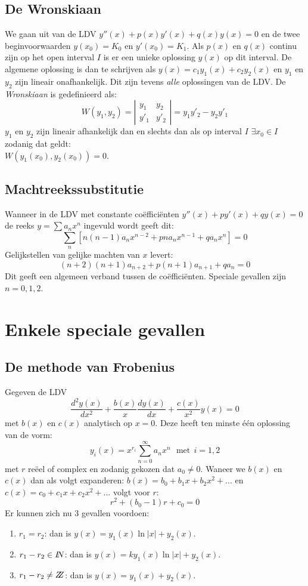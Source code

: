 \subsection{De Wronskiaan}
We gaan uit van de LDV $y''(x)+p(x)y'(x)+q(x)y(x)=0$ en de twee beginvoorwaarden
$y(x_0)=K_0$ en $y'(x_0)=K_1$. Als $p(x)$ en $q(x)$ continu zijn op het open
interval $I$ is er een unieke oplossing $y(x)$ op dit interval.
\npar
De algemene oplossing is dan te schrijven als $y(x)=c_1y_1(x)+c_2y_2(x)$ en
$y_1$ en $y_2$ zijn lineair onafhankelijk. Dit zijn tevens {\it alle}
oplossingen van de LDV.
\npar
De {\it Wronskiaan} is gedefinieerd als:
\[
W(y_1,y_2)=
\left|\begin{array}{cc}
y_1&y_2\\
y'_1&y'_2
\end{array}\right|=y_1y'_2-y_2y'_1
\]
$y_1$ en $y_2$ zijn lineair afhankelijk dan en slechts dan als op interval
$I$ $\exists x_0\in I$ zodanig dat geldt:\\
$W(y_1(x_0),y_2(x_0))=0$.

\subsection{Machtreekssubstitutie}
Wanneer in de LDV met constante co\"effici\"enten $y''(x)+py'(x)+qy(x)=0$ de
reeks $y=\sum a_nx^n$ ingevuld wordt geeft dit:
\[
\sum_n\left[n(n-1)a_nx^{n-2}+pna_nx^{n-1}+qa_nx^n\right]=0
\]
Gelijkstellen van gelijke machten van $x$ levert:
\[
(n+2)(n+1)a_{n+2}+p(n+1)a_{n+1}+qa_n=0
\]
Dit geeft een algemeen verband tussen de co\"effici\"enten. Speciale gevallen
zijn $n=0,1,2$.

\section{Enkele speciale gevallen}
\subsection{De methode van Frobenius}
Gegeven de LDV
\[
\frac{d^2y(x)}{dx^2}+\frac{b(x)}{x}\frac{dy(x)}{dx}+\frac{c(x)}{x^2}y(x)=0
\]
met $b(x)$ en $c(x)$ analytisch op $x=0$. Deze heeft ten minste \'e\'en
oplossing van de vorm:
\[
y_i(x)=x^{r_i}\sum_{n=0}^\infty a_nx^n~~~\mbox{met}~~i=1,2
\]
met $r$ re\"eel of complex en zodanig gekozen dat $a_0\neq0$. Waneer we $b(x)$
en $c(x)$ dan als volgt expanderen: $b(x)=b_0+b_1x+b_2x^2+...$ en
$c(x)=c_0+c_1x+c_2x^2+...$ volgt voor $r$:
\[
r^2+(b_0-1)r+c_0=0
\]
Er kunnen zich nu 3 gevallen voordoen:
\begin{enumerate}
\item $r_1=r_2$: dan is $y(x)=y_1(x)\ln|x|+y_2(x)$.
\item $r_1-r_2\in I\hspace{-1mm}N$: dan is $y(x)=ky_1(x)\ln|x|+y_2(x)$.
\item $r_1-r_2\neq Z\hspace{-1ex}Z$: dan is $y(x)=y_1(x)+y_2(x)$.
\end{enumerate}

